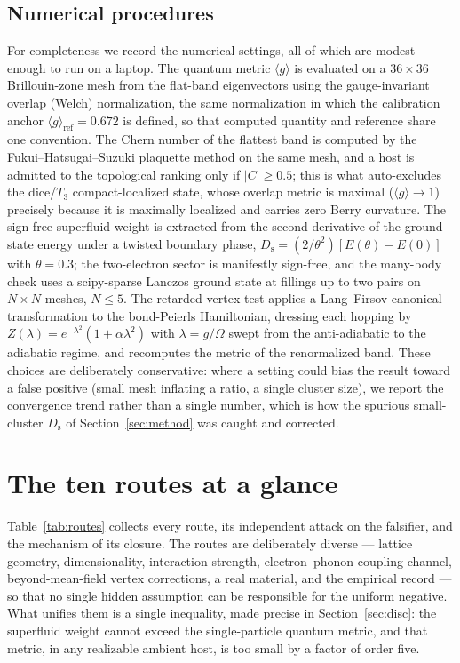 \documentclass[11pt,a4paper]{article}
\newcommand{\qgg}{\langle g \rangle}
\newcommand{\Ds}{D_{\mathrm{s}}}
\begin{document}
\subsection{Numerical procedures}
\label{sec:numerics}
For completeness we record the numerical settings, all of which are modest enough to run on a
laptop. The quantum metric $\qgg$ is evaluated on a $36\times36$ Brillouin-zone mesh from the
flat-band eigenvectors using the gauge-invariant overlap (Welch) normalization, the same
normalization in which the calibration anchor $\qgg_{\mathrm{ref}}=0.672$ is defined, so that
computed quantity and reference share one convention. The Chern number of the flattest band is
computed by the Fukui--Hatsugai--Suzuki plaquette method on the same mesh, and a host is admitted to
the topological ranking only if $|C|\ge 0.5$; this is what auto-excludes the dice/$T_3$
compact-localized state, whose overlap metric is maximal ($\qgg\to1$) precisely because it is
maximally localized and carries zero Berry curvature. The sign-free superfluid weight is extracted
from the second derivative of the ground-state energy under a twisted boundary phase, $\Ds =
(2/\theta^2)[E(\theta)-E(0)]$ with $\theta=0.3$; the two-electron sector is manifestly sign-free,
and the many-body check uses a scipy-sparse Lanczos ground state at fillings up to two pairs on
$N\times N$ meshes, $N\le5$. The retarded-vertex test applies a Lang--Firsov canonical transformation
to the bond-Peierls Hamiltonian, dressing each hopping by $Z(\lambda)=e^{-\lambda^2}(1+\alpha\lambda^2)$
with $\lambda=g/\Omega$ swept from the anti-adiabatic to the adiabatic regime, and recomputes the
metric of the renormalized band. These choices are deliberately conservative: where a setting could
bias the result toward a false positive (small mesh inflating a ratio, a single cluster size), we
report the convergence trend rather than a single number, which is how the spurious small-cluster
$\Ds$ of Section~\ref{sec:method} was caught and corrected.

\section{The ten routes at a glance}
\label{sec:routes}
Table~\ref{tab:routes} collects every route, its independent attack on the falsifier, and the
mechanism of its closure. The routes are deliberately diverse --- lattice geometry, dimensionality,
interaction strength, electron--phonon coupling channel, beyond-mean-field vertex corrections, a
real material, and the empirical record --- so that no single hidden assumption can be responsible
for the uniform negative. What unifies them is a single inequality, made precise in
Section~\ref{sec:disc}: the superfluid weight cannot exceed the single-particle quantum metric, and
that metric, in any realizable ambient host, is too small by a factor of order five.
\end{document}
